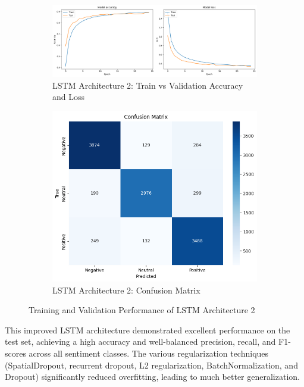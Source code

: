 \begin{figure}[h!]
\centering
\begin{subfigure}[t]{0.48\textwidth}
\centering
\includegraphics[width=\textwidth]{./images/lstm-acc.png}
\caption{LSTM Architecture 2: Train vs Validation Accuracy and Loss}
\label{fig:cnn2_ac1curacy}
\end{subfigure}
\hfill
\begin{subfigure}[t]{0.30\textwidth}
\centering
\includegraphics[width=\textwidth]{./images/lstm-cm.png}
\caption{LSTM Architecture 2: Confusion Matrix}
\label{fig:cnn2_lo1ss}
\end{subfigure}
\caption{Training and Validation Performance of LSTM Architecture 2}
\label{fig:cnn2_pe1rformance}
\end{figure}

This improved LSTM architecture demonstrated excellent performance on the test set, achieving a high accuracy and well-balanced precision, recall, and F1-scores across all sentiment classes. The various regularization techniques (SpatialDropout, recurrent dropout, L2 regularization, BatchNormalization, and Dropout) significantly reduced overfitting, leading to much better generalization.

